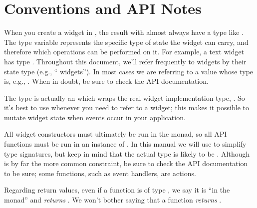 \section{Conventions and API Notes}

When you create a widget in \vtyui, the result with almost always have
a type like .  The type variable  represents the
specific type of state the widget can carry, and therefore which
operations can be performed on it.  For example, a text widget has
type .  Throughout this document, we'll refer
frequently to widgets by their state type (e.g., ``
widgets''). In most cases we are referring to a value whose type is,
e.g., .  When in doubt, be sure to check the API
documentation.

The  type is actually an  which wraps the real
widget implementation type, .  So it's best to use
 whenever you need to refer to a widget; this makes it
possible to mutate widget state when events occur in your application.

All widget constructors must ultimately be run in the  monad,
so all API functions must be run in an instance of .  In
this manual we will use  to simplify type signatures, but keep
in mind that the actual type is likely to be .
Although  is by far the more common constraint, be sure to
check the API documentation to be sure; some functions, such as event
handlers, are  actions.

Regarding return values, even if a function is of type , we say it is ``in the  monad'' and \textit{returns}
.  We won't bother saying that a function \textit{returns }.
